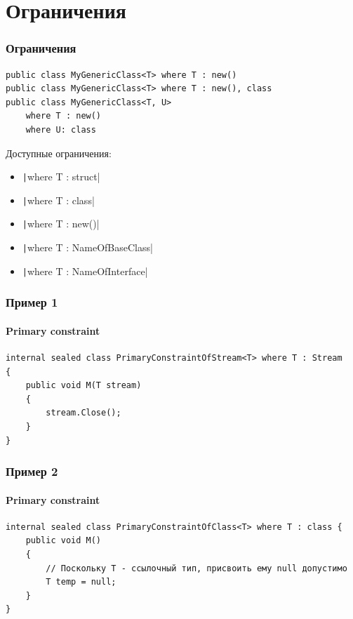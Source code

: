 \documentclass[xetex,mathserif,serif]{beamer}
\begin{document}
    \section{Ограничения}
    
    \begin{frame}[fragile]
        \frametitle{Ограничения}
        \begin{verbatim}
public class MyGenericClass<T> where T : new()
public class MyGenericClass<T> where T : new(), class
public class MyGenericClass<T, U> 
    where T : new() 
    where U: class
        \end{verbatim}

        Доступные ограничения:
        \begin{itemize}
            \item \texttt|where T : struct|
            \item \texttt|where T : class|
            \item \texttt|where T : new()|
            \item \texttt|where T : NameOfBaseClass|
            \item \texttt|where T : NameOfInterface|
        \end{itemize}
    \end{frame}

    \begin{frame}[fragile]
        \frametitle{Пример 1}
        \framesubtitle{Primary constraint}
        \begin{footnotesize}
            \begin{verbatim}
internal sealed class PrimaryConstraintOfStream<T> where T : Stream 
{
    public void M(T stream) 
    {
        stream.Close();
    }
}
            \end{verbatim}
        \end{footnotesize}
    \end{frame}

    \begin{frame}[fragile]
        \frametitle{Пример 2}
        \framesubtitle{Primary constraint}
        \begin{footnotesize}
            \begin{verbatim}
internal sealed class PrimaryConstraintOfClass<T> where T : class {
    public void M() 
    {
        // Поскольку T - ссылочный тип, присвоить ему null допустимо
        T temp = null;
    }
}
            \end{verbatim}
        \end{footnotesize}
    \end{frame}
\end{document}
